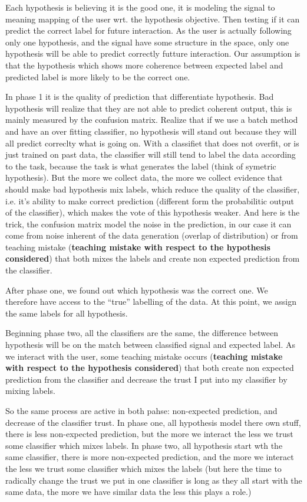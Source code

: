 Each hypothesis is believing it is the good one, it is modeling the signal to meaning mapping of the user wrt. the hypothesis objective. Then testing if it can predict the correct label for future interaction. As the user is actually following only one hypothesis, and the signal have some structure in the space, only one hypothesis will be able to predict correctly futture interaction. Our assumption is that the hypothesis which shows more coherence between expected label and predicted label is more likely to be the correct one. 

In phase 1 it is the quality of prediction that differentiate hypothesis. Bad hypothesis will realize that they are not able to predict coherent output, this is mainly measured by the confusion matrix. Realize that if we use a batch method and have an over fitting classifier, no hypothesis will stand out because they will all predict correclty what is going on. With a classifiet that does not overfit, or is just trained on past data, the classifier will still tend to label the data according to the task, because the task is what generates the label (think of symetric hypothesis). But the more we collect data, the more we collect evidence that should make bad hypothesis mix labels, which reduce the quality of the classifier, i.e. it's ability to make correct prediction (different form the probabilitic output of the classifier), which makes the vote of this hypothesis weaker. And here is the trick, the confusion matrix model the noise in the prediction, in our case it can come from noise inherent of the data generation (overlap of distribution) or from teaching mistake (\textbf{teaching mistake with respect to the hypothesis considered}) that both mixes the labels and create non expected prediction from the classifier.

After phase one, we found out which hypothesis was the correct one. We therefore have access to the ``true'' labelling of the data. At this point, we assign the same labels for all hypothesis.

Beginning phase two, all the classifiers are the same, the difference between hypothesis will be on the match between classified signal and expected label. As we interact with the user, some teaching mistake occurs (\textbf{teaching mistake with respect to the hypothesis considered}) that both create non expected prediction from the classifier and decrease the trust I put into my classifier by mixing labels.

So the same process are active in both pahse: non-expected prediction, and decrease of the classifier trust.
In phase one, all hypothesis model there own stuff, there is less non-expected prediction, but the more we interact the less we trust some classifier which mixes labels.
In phase two, all hypothesis start wth the same classifier, there is more non-expected prediction, and the more we interact the less we trust some classifier which mixes the labels (but here the time to radically change the trust we put in one classifier is long as they all start with the same data, the more we have similar data the less this plays a role.)

